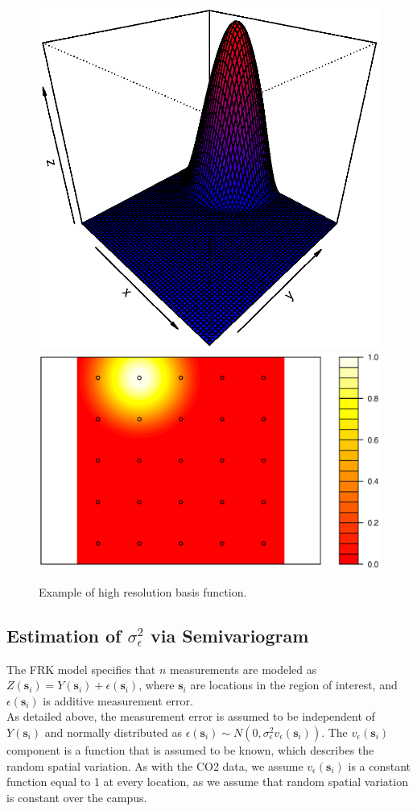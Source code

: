 \documentclass[11pt]{article}
\begin{document}
\begin{figure}[H]
\centering
\includegraphics[width=0.55\columnwidth]{./Images/res3}
\includegraphics[width=0.44\columnwidth]{./Images/res31}
\caption{Example of high resolution basis function.}
\label{fig:res3}
\end{figure}

\subsection{Estimation of $\sigma^2_{\epsilon}$ via Semivariogram}

The FRK model specifies that $n$ measurements are modeled as $Z(\bm{s}_i) = Y(\bm{s}_i) + \epsilon(\bm{s}_i)$, where $\bm{s}_i$ are locations in the region of interest, and $\epsilon(\bm{s}_i)$ is additive measurement error.\\

As detailed above, the measurement error is assumed to be independent of $Y(\bm{s}_i)$ and normally distributed as $\epsilon(\bm{s}_i) \sim N(0,\sigma^2_\epsilon v_\epsilon (\bm{s}_i))$.  The $v_\epsilon (\bm{s}_i)$ component is a function that is assumed to be known, which describes the random spatial variation.  As with the CO2 data, we assume $v_\epsilon (\bm{s}_i)$ is a constant function equal to 1 at every location, as we assume that random spatial variation is constant over the campus. \\
\end{document}
